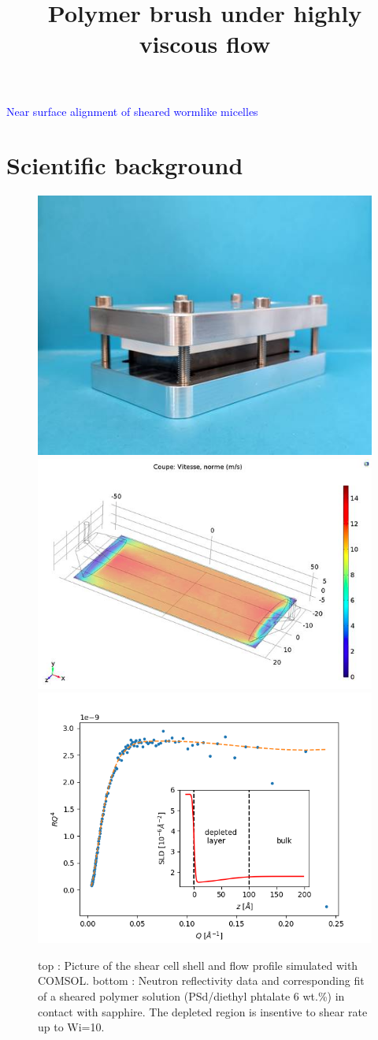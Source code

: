 \documentclass[12pt]{article}
\title{Polymer brush under highly viscous flow}
\author{}
\date{}
\begin{document}

\begin{center}
	\textcolor{blue}{\huge{Near surface alignment of sheared wormlike micelles}}
\end{center}

\section*{Scientific background}
\begin{figure}
	\centering
	\includegraphics[width=0.4\linewidth]{photo_cell.jpg}
	\includegraphics[width=0.4\linewidth]{flow_profile.png}
	\includegraphics[width=\linewidth]{data_depletion.png}\\
	\textcolor{blue}{\caption{top : Picture of the shear cell shell and flow profile simulated with COMSOL.
			bottom : Neutron reflectivity data and corresponding fit of a sheared polymer solution (PSd/diethyl phtalate 6 wt.\%) in contact with sapphire. The depleted region is insentive to shear rate up to Wi=10.\label{fig:depletion}}}
\end{figure}
\end{document}
